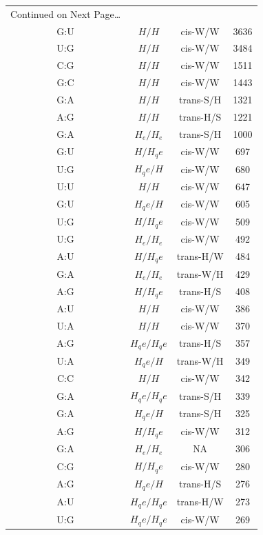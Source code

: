 \begin{center}
\begin{longtable}{c|c|c|c}
\multicolumn{1}{l}{Continued on Next Page\ldots} \\
\endfoot
\endlastfoot
G:U & $H/H$ & cis-W/W & 3636 \\  \hline
U:G & $H/H$ & cis-W/W & 3484 \\  \hline
C:G & $H/H$ & cis-W/W & 1511 \\  \hline
G:C & $H/H$ & cis-W/W & 1443 \\  \hline
G:A & $H/H$ & trans-S/H & 1321 \\  \hline
A:G & $H/H$ & trans-H/S & 1221 \\  \hline
G:A & $H_e/H_e$ & trans-S/H & 1000 \\  \hline
G:U & $H/H_qe$ & cis-W/W & 697 \\  \hline
U:G & $H_qe/H$ & cis-W/W & 680 \\  \hline
U:U & $H/H$ & cis-W/W & 647 \\  \hline
G:U & $H_qe/H$ & cis-W/W & 605 \\  \hline
U:G & $H/H_qe$ & cis-W/W & 509 \\  \hline
U:G & $H_e/H_e$ & cis-W/W & 492 \\  \hline
A:U & $H/H_qe$ & trans-H/W & 484 \\  \hline
G:A & $H_e/H_e$ & trans-W/H & 429 \\  \hline
A:G & $H/H_qe$ & trans-H/S & 408 \\  \hline
A:U & $H/H$ & cis-W/W & 386 \\  \hline
U:A & $H/H$ & cis-W/W & 370 \\  \hline
A:G & $H_qe/H_qe$ & trans-H/S & 357 \\  \hline
U:A & $H_qe/H$ & trans-W/H & 349 \\  \hline
C:C & $H/H$ & cis-W/W & 342 \\  \hline
G:A & $H_qe/H_qe$ & trans-S/H & 339 \\  \hline
G:A & $H_qe/H$ & trans-S/H & 325 \\  \hline
A:G & $H/H_qe$ & cis-W/W & 312 \\  \hline
G:A & $H_e/H_e$ & NA & 306 \\  \hline
C:G & $H/H_qe$ & cis-W/W & 280 \\  \hline
A:G & $H_qe/H$ & trans-H/S & 276 \\  \hline
A:U & $H_qe/H_qe$ & trans-H/W & 273 \\  \hline
U:G & $H_qe/H_qe$ & cis-W/W & 269 \\  \hline

\end{longtable}
\end{center}
